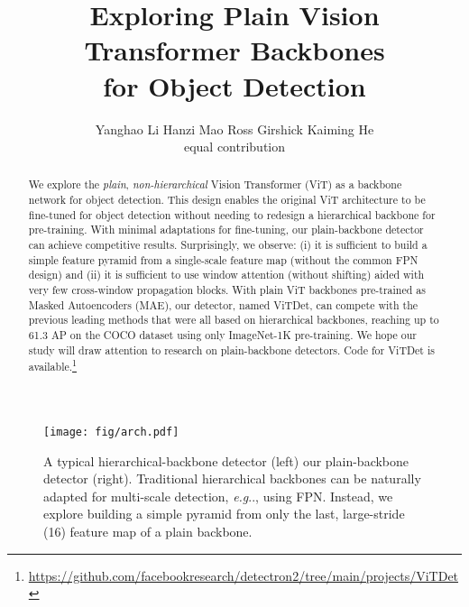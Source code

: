 \documentclass[runningheads]{llncs}
\makeatletter
\DeclareRobustCommand\onedot{\futurelet\@let@token\@onedot}
\def\@onedot{\ifx\@let@token.\else.\null\fi\xspace}
\def\eg{\emph{e.g}\onedot} \def\Eg{\emph{E.g}\onedot}
\makeatother
\begin{document}
\pagestyle{headings}
\mainmatter

\title{Exploring Plain Vision Transformer Backbones \\ for Object Detection \vspace{-.5em}}

\titlerunning{~}
\author{
Yanghao Li \quad
Hanzi Mao \quad
Ross Girshick \quad
Kaiming He
\\{\scriptsize equal contribution}
}
\authorrunning{~}
\maketitle

\begin{abstract}
\vspace{-2em}
We explore the \textit{plain}, \textit{non-hierarchical} Vision Transformer (ViT) as a backbone network for object detection. This design enables the original ViT architecture to be fine-tuned for object detection without needing to redesign a hierarchical backbone for pre-training. With minimal adaptations for fine-tuning, our plain-backbone detector can achieve competitive results. Surprisingly, we observe: (i) it is sufficient to build a simple feature pyramid from a single-scale feature map (without the common FPN design) and (ii) it is sufficient to use window attention (without shifting) aided with very few cross-window propagation blocks. With plain ViT backbones pre-trained as Masked Autoencoders (MAE), our detector, named \mbox{ViTDet}, can compete with the previous leading methods that were all based on hierarchical backbones, reaching up to 61.3 AP on the COCO dataset using only ImageNet-1K pre-training. We hope our study will draw attention to research on plain-backbone detectors. Code for ViTDet is available.\footnote{\url{https://github.com/facebookresearch/detectron2/tree/main/projects/ViTDet}}
\vspace{-2em}
\end{abstract}
    

\begin{figure}[t]
\vspace{-.5em}
\centering
\texttt{[image: fig/arch.pdf]}
\vspace{-1.2em}
\caption{A typical hierarchical-backbone detector (left) \vs our plain-backbone detector (right).
Traditional  hierarchical backbones can be naturally adapted for multi-scale detection, \eg, using FPN. Instead, we explore building a simple pyramid from only the last, large-stride (16) feature map of a plain backbone.
}
\label{fig:arch}
\vspace{-.75em}
\end{figure}
\end{document}
